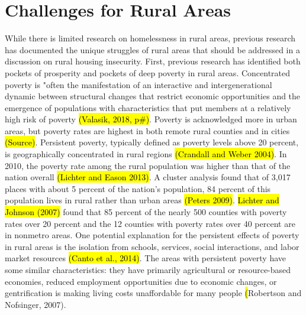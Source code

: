 \section{Challenges for Rural Areas}

 While there is limited research on homelessness in rural areas, previous research has documented the unique struggles of rural areas that should be addressed in a discussion on rural housing insecurity. First, previous research has identified both pockets of prosperity and pockets of deep poverty in rural areas. Concentrated poverty is "often the manifestation of an interactive and intergenerational dynamic between structural changes that restrict economic opportunities and the emergence of populations with characteristics that put members at a relatively high risk of poverty \hl{(Valasik, 2018, p\#)}. Poverty is acknowledged more in urban areas, but poverty rates are highest in both remote rural counties and in cities \hl{(Source)}. Persistent poverty, typically defined as poverty levels above 20 percent, is geographically concentrated in rural regions \hl{(Crandall and Weber 2004)}. In 2010, the poverty rate among the rural population was higher than that of the nation overall \hl{(Lichter and Eason 2013)}. A cluster analysis found that of 3,017 places with about 5 percent of the nation's population, 84 percent of this population lives in rural rather than urban areas \hl{(Peters 2009)}. \hl{Lichter and Johnson (2007)} found that 85 percent of the nearly 500 counties with poverty rates over 20 percent and the 12 counties with poverty rates over 40 percent are in nonmetro areas. One potential explanation for the persistent effects of poverty in rural areas is the isolation from schools, services, social interactions, and labor market resources \hl{(Canto et al., 2014)}. The areas with persistent poverty have some similar characteristics: they have primarily agricultural or resource-based economies, reduced employment opportunities due to economic changes, or gentrification is making living costs unaffordable for many people \hl(Robertson and Nofsinger, 2007). 
 
